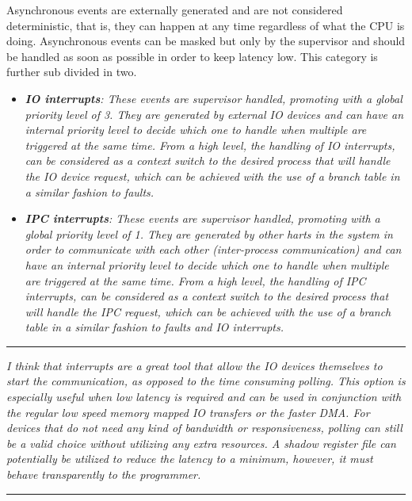 \documentclass{article}
\begin{document}
            Asynchronous events are externally generated and are not considered deterministic, that is, they can happen at any time regardless of what the CPU is doing. Asynchronous events can be masked but only by the supervisor and should be handled as soon as possible in order to keep latency low. This category is further sub divided in two.

            \begin{itemize}

                \item \textit{\textbf{IO interrupts}: These events are supervisor handled, promoting with a global priority level of 3. They are generated by external IO devices and can have an internal priority level to decide which one to handle when multiple are triggered at the same time. From a high level, the handling of IO interrupts, can be considered as a context switch to the desired process that will handle the IO device request, which can be achieved with the use of a branch table in a similar fashion to faults.}

                \item \textit{\textbf{IPC interrupts}: These events are supervisor handled, promoting with a global priority level of 1. They are generated by other harts in the system in order to communicate with each other (inter-process communication) and can have an internal priority level to decide which one to handle when multiple are triggered at the same time. From a high level, the handling of IPC interrupts, can be considered as a context switch to the desired process that will handle the IPC request, which can be achieved with the use of a branch table in a similar fashion to faults and IO interrupts.}

            \end{itemize}

        \par\noindent\rule{\textwidth}{0.4pt}
        \textit{I think that interrupts are a great tool that allow the IO devices themselves to start the communication, as opposed to the time consuming polling. This option is especially useful when low latency is required and can be used in conjunction with the regular low speed memory mapped IO transfers or the faster DMA. For devices that do not need any kind of bandwidth or responsiveness, polling can still be a valid choice without utilizing any extra resources. A shadow register file can potentially be utilized to reduce the latency to a minimum, however, it must behave transparently to the programmer.}
        \par\noindent\rule{\textwidth}{0.4pt}
\end{document}
